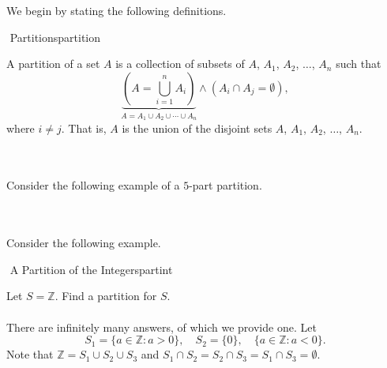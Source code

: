         We begin by stating the following definitions.
        \begin{definition}{\Stop\,\,Partitions}{partition}
        
           A partition of a set \(A\) is a collection of subsets of \(A\), \(A_1\), \(A_2\), \(\ldots\), \(A_n\) such that
           \begin{equation*}
               \underbrace{\left(A=\bigcup_{i=1}^n A_i\right)}_{A=A_1\cup A_2\cup \cdots \cup A_n}\wedge(A_i\cap A_j=\emptyset),
           \end{equation*}
           where \(i\neq j\). That is, \(A\) is the union of the disjoint sets \(A\), \(A_1\), \(A_2\), \(\ldots\), \(A_n\).
        \end{definition}
        \vphantom
        \\
        \\
        Consider the following example of a \(5\)-part partition.
        \begin{center}
        \end{center}
        \vphantom
        \\
        \\
        Consider the following example.
        \begin{example}{\Difficulty\,\,A Partition of the Integers}{partint}
        
            Let \(S=\mathbb{Z}\). Find a partition for \(S\).
            \\
            \\
            There are infinitely many answers, of which we provide one. Let 
            \begin{equation*}
                S_1=\{a\in\mathbb{Z}:a>0\},\quad S_2=\{0\},\quad \{a\in\mathbb{Z}:a<0\}.
            \end{equation*}
            Note that \(\mathbb{Z}=S_1\cup S_2\cup S_3\) and \(S_1\cap S_2=S_2\cap S_3=S_1\cap S_3=\emptyset\).
        
        \end{example}

